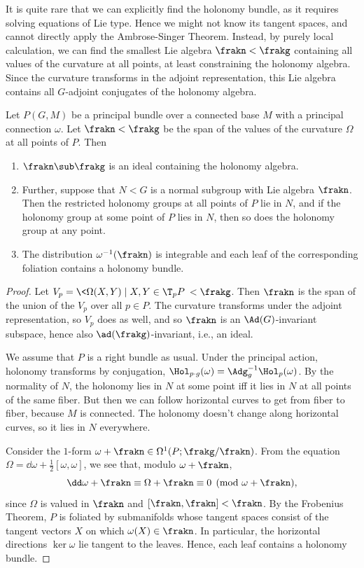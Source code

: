 It is quite rare that we can explicitly find the holonomy bundle, as it requires solving equations of Lie type. Hence we might not know its tangent spaces, and cannot directly apply the Ambrose-Singer Theorem. Instead, by purely local calculation, we can find the smallest Lie algebra $\frakn< \frakg$ containing all values of the curvature at all points, at least constraining the holonomy algebra. Since the curvature transforms in the adjoint representation, this Lie algebra contains all $G$-adjoint conjugates of the holonomy algebra.

\begin{thm}\label{thm 16.26 McKay}
    Let $P(G,M)$ be a principal bundle over a connected base $M$ with a principal connection $\omega$. Let $\frakn<\frakg$ be the span of the values of the curvature $\Omega$ at all points of $P$. Then 
    \begin{enumerate}
        \item $\frakn\sub \frakg$ is an ideal containing the holonomy algebra. 
        \item Further, suppose that $N<G$ is a normal subgroup with Lie algebra $\frakn$. Then the restricted holonomy groups at all points of $P$ lie in $N$, and if the holonomy group at some point of $P$ lies in $N$, then so does the holonomy group at any point.
        \item The distribution $\omega^{-1}(\frakn)$ is integrable and each leaf of the corresponding foliation contains a holonomy bundle.
    \end{enumerate}
\end{thm}
\begin{proof}
    Let $V_{p}=\<\Omega(X,Y)\mid X,Y\in\T_{p}P\><\frakg$. Then $\frakn$ is the span of the union of the $V_{p}$ over all $p\in P$. The curvature transforms under the adjoint representation, so $V_p$ does as well, and so $\frakn$ is an $\Ad(G)$-invariant subspace, hence also $\ad(\frakg)$-invariant, i.e., an ideal. 

    We assume that $P$ is a right bundle as usual. Under the principal action, holonomy transforms by conjugation, $\Hol_{p\cdot g}(\omega)=\Adg_g^{-1}\Hol_p(\omega)$. By the normality of $N$, the holonomy lies in $N$ at some point iff it lies in $N$ at all points of the same fiber. But then we can follow horizontal curves to get from fiber to fiber, because $M$ is connected. The holonomy doesn't change along horizontal curves, so it lies in $N$ everywhere.

    Consider the $1$-form $\omega+\frakn\in\Omega^1(P;\frakg\slash\frakn)$. From the equation $\Omega=\dd\omega+\frac12[\omega,\omega]$, we see that, modulo $\omega+\frakn$,
    \[\dd\omega+\frakn\equiv \Omega+\frakn\equiv 0\pmod{\omega+\frakn},\]
    since $\Omega$ is valued in $\frakn$ and $[\frakn,\frakn]<\frakn$. By the Frobenius Theorem, $P$ is foliated by submanifolds whose tangent spaces consist of the tangent vectors $X$ on which $\omega(X)\in\frakn$. In particular, the horizontal directions $\ker\omega$ lie tangent to the leaves. Hence, each leaf contains a holonomy bundle.
\end{proof}

